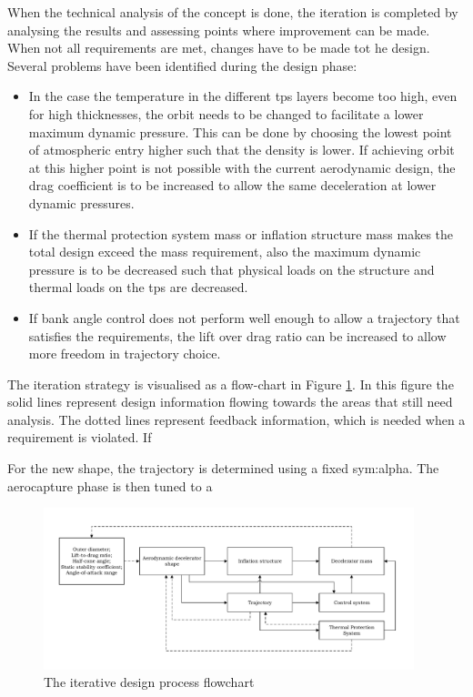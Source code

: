 When the technical analysis of the concept is done, the iteration is completed by analysing the results and assessing points where improvement can be made. When not all requirements are met, changes have to be made tot he design. Several problems have been identified during the design phase:
\begin{itemize}
	\item In the case the temperature in the different \gls{tps} layers become too high, even for high thicknesses, the orbit needs to be changed to facilitate a lower maximum dynamic pressure. This can be done by choosing the lowest point of atmospheric entry higher such that the density is lower. If achieving orbit at this higher point is not possible with the current aerodynamic design, the drag coefficient is to be increased to allow the same deceleration at lower dynamic pressures.
	
	\item If the thermal protection system mass or inflation structure mass makes the total design exceed the mass requirement, also the maximum dynamic pressure is to be decreased such that physical loads on the structure and thermal loads on the \gls{tps} are decreased.
	
	\item If bank angle control does not perform well enough to allow a trajectory that satisfies the requirements, the lift over drag ratio can be increased to allow more freedom in trajectory choice.
	
	
\end{itemize}

The iteration strategy is visualised as a flow-chart in Figure \ref{fig:iterativedesignflowchart}. In this figure the solid lines represent design information flowing towards the areas that still need analysis. The dotted lines represent feedback information, which is needed when a requirement is violated. If 



For the new shape, the trajectory is determined using a fixed \gls{sym:alpha}. The aerocapture phase is then tuned to a 


\begin{figure}[h!]
		\vspace{-1cm}
		\includegraphics[width=0.96\textwidth]{./Figure/DesignIterationPhilosophy.pdf}
		\vspace{-2.3cm}
		\caption{The iterative design process flowchart}
		\label{fig:iterativedesignflowchart}
\end{figure}